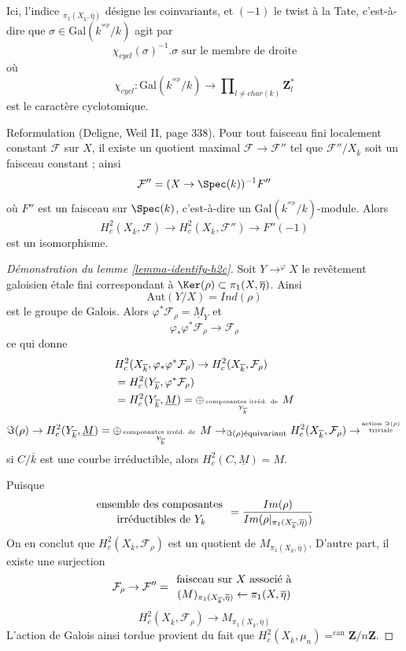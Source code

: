 \noindent
Ici, l'indice ${}_{\pi_1(X_{\overline{k}}, \overline\eta)}$
désigne les coinvariants, et $(-1)$ le twist à la Tate, c'est-à-dire que
$\sigma\in \text{Gal}(k^{^{sep}}/k)$ agit par
$$
\chi_{cycl}(\sigma)^{-1}.\sigma\text{ sur le membre de droite}
$$
où
$$
\chi_{cycl} :
\text{Gal}(k^{^{sep}}/k)
\to
\prod\nolimits_{l\neq char(k)}\mathbf{Z}_l^*
$$
est le caractère cyclotomique.

\medskip\noindent
Reformulation (Deligne, Weil II, page 338). Pour tout faisceau fini localement
constant $\mathcal{F}$ sur $X$, il existe un quotient maximal $\mathcal{F}\to
\mathcal{F}''$ tel que $\mathcal{F}''/X_{\overline{k}}$ soit un faisceau constant ; ainsi
$$
\mathcal{F}'' = (X\to \Spec(k))^{-1}F''
$$
où $F''$ est un faisceau sur $\Spec(k)$, c'est-à-dire un
$\text{Gal}(k^{^{sep}}/k)$-module. Alors
$$
H_c^2(X_{\overline{k}}, \mathcal{F})\to H_c^2(X_{\overline{k}},
\mathcal{F}'')\to F''(-1)
$$
est un isomorphisme.

\begin{proof}[Démonstration du lemme \ref{lemma-identify-h2c}]
Soit $Y\to^{\varphi}X$ le revêtement galoisien étale fini
correspondant à $\Ker(\rho) \subset \pi_1(X, \overline\eta)$. Ainsi
$$
\text{Aut}(Y/X)=Ind(\rho)
$$
est le groupe de Galois. Alors $\varphi^*\mathcal{F}_\rho =\underline M_Y$ et
$$
\varphi_*\varphi^*\mathcal{F}_\rho\to \mathcal{F}_\rho
$$
ce qui donne
\begin{align*}
& H_c^2(X_{\overline{k}}, \varphi_*\varphi^*\mathcal{F}_\rho) \to
H_c^2(X_{\overline{k}}, \mathcal{F}_\rho)\\
& =H_c^2(Y_{\overline{k}}, \varphi^*\mathcal{F}_\rho)\\
& =H_c^2(Y_{\overline{k}}, \underline M) = \oplus_{\text{composantes irréd.
de } \atop Y_{\overline{k}}}M
\end{align*}
$$
\Im(\rho) \to H_c^2(Y_{\overline{k}}, \underline M) =
\oplus_{\text{composantes irréd. de } \atop Y_{\overline{k}}}
M \to_{\Im(\rho) \text{équivariant}} H_c^2(X_{\overline{k}},
\mathcal{F}_{\rho}) \to^{\text{action }
\Im(\rho) \atop \text{triviale}}
$$
si $C/\overline{k}$ est une courbe irréductible, alors $H_c^2(C, \underline M)=M$.

\medskip\noindent
Puisque
$$
{\text{ensemble des composantes } \atop \text{irréductibles de }Y_k} =
\frac{Im(\rho)}{Im(\rho|_{\pi_1(X_{\overline{k}}, \overline \eta)})}
$$
On en conclut que $H_c^2(X_{\overline{k}}, \mathcal{F}_\rho)$ est un
quotient de $M_{\pi_1(X_{\overline{k}}, \overline \eta)}$. D'autre part,
il existe une surjection
$$
\mathcal{F}_\rho\to \mathcal{F}'' = {\text{ faisceau sur }
X\text{ associé à } \atop (M)_{\pi_1(X_{\overline{k}}, \overline
\eta)}\leftarrow\pi_1(X, \overline \eta)}
$$
$$
H_c^2(X_{\overline{k}}, \mathcal{F}_\rho)\to
M_{\pi_1(X_{\overline{k}}, \overline\eta)}
$$
L'action de Galois ainsi tordue provient du fait que
$H_c^2(X_{\overline{k}}, \mu_n)=^{\text{can}} \mathbf{Z}/n\mathbf{Z}$.
\end{proof}

